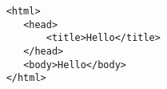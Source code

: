 \begin{verbatim}
    <html>
       <head>
           <title>Hello</title>
       </head>
       <body>Hello</body>
    </html>
\end{verbatim}